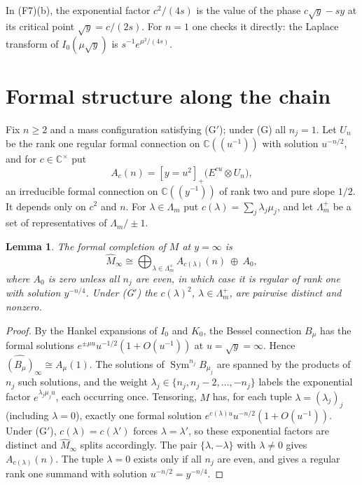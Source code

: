 \documentclass[11pt,a4paper]{article}
\newtheorem{lemma}[theorem]{Lemma}
\theoremstyle{definition}
\theoremstyle{remark}
\numberwithin{equation}{section}
\newcommand{\C}{\mathbb{C}}
\DeclareMathOperator{\Sym}{Sym}
\begin{document}
In (F7)(b), the exponential factor $c^2/(4s)$ is the value of the phase $c\sqrt y-sy$ at its critical point $\sqrt y=c/(2s)$. For $n=1$ one checks it directly: the Laplace transform of $I_0(\mu\sqrt y)$ is $s^{-1}e^{\mu^2/(4s)}$.

\section{Formal structure along the chain}\label{bs:sec:formal}

Fix $n\ge2$ and a mass configuration satisfying (G$'$); under (G) all $n_j=1$. Let $U_n$ be the rank one regular formal connection on $\C((u^{-1}))$ with solution $u^{-n/2}$, and for $c\in\C^\times$ put
\[
A_c(n)=[y=u^2]_+\bigl(E^{cu}\otimes U_n\bigr),
\]
an irreducible formal connection on $\C((y^{-1}))$ of rank two and pure slope $1/2$. It depends only on $c^2$ and $n$. For $\lambda\in\Lambda_m$ put $c(\lambda)=\sum_j\lambda_j\mu_j$, and let $\Lambda_m^+$ be a set of representatives of $\Lambda_m/\pm1$.

\begin{lemma}\label{bs:lem:Minf}
The formal completion of $M$ at $y=\infty$ is
\[
\widehat M_\infty\cong\bigoplus_{\lambda\in\Lambda_m^+}A_{c(\lambda)}(n)\ \oplus\ A_0,
\]
where $A_0$ is zero unless all $n_j$ are even, in which case it is regular of rank one with solution $y^{-n/4}$. Under {\rm(G$'$)} the $c(\lambda)^2$, $\lambda\in\Lambda_m^+$, are pairwise distinct and nonzero.
\end{lemma}

\begin{proof}
By the Hankel expansions of $I_0$ and $K_0$, the Bessel connection $B_\mu$ has the formal solutions $e^{\pm\mu u}u^{-1/2}(1+O(u^{-1}))$ at $u=\sqrt y=\infty$. Hence $\widehat{(B_\mu)}_\infty\cong A_\mu(1)$. The solutions of $\Sym^{n_j}B_{\mu_j}$ are spanned by the products of $n_j$ such solutions, and the weight $\lambda_j\in\{n_j,n_j-2,\dots,-n_j\}$ labels the exponential factor $e^{\lambda_j\mu_ju}$, each occurring once. Tensoring, $M$ has, for each tuple $\lambda=(\lambda_j)_j$ (including $\lambda=0$), exactly one formal solution $e^{c(\lambda)u}u^{-n/2}(1+O(u^{-1}))$. Under (G$'$), $c(\lambda)=c(\lambda')$ forces $\lambda=\lambda'$, so these exponential factors are distinct and $\widehat M_\infty$ splits accordingly. The pair $\{\lambda,-\lambda\}$ with $\lambda\ne0$ gives $A_{c(\lambda)}(n)$. The tuple $\lambda=0$ exists only if all $n_j$ are even, and gives a regular rank one summand with solution $u^{-n/2}=y^{-n/4}$.
\end{proof}
\end{document}
